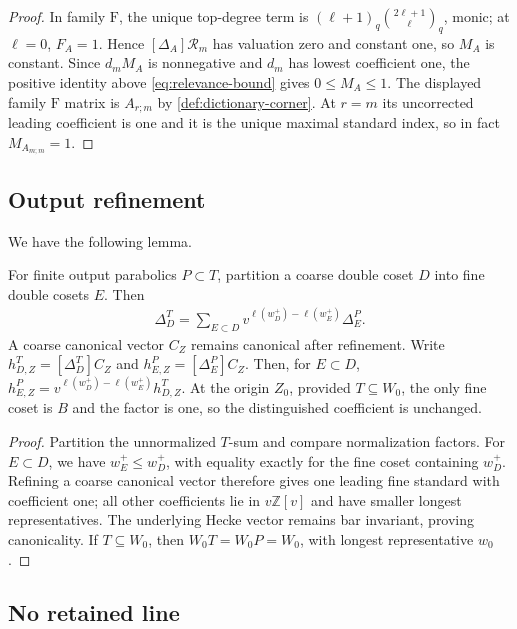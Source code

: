 \documentclass[a4paper,11pt]{amsart}
\numberwithin{equation}{subsection}
\theoremstyle{plain}
\theoremstyle{definition}
\theoremstyle{remark}
\newcommand{\gbinom}[2]{\binom{#1}{#2}}
\begin{document}
\begin{proof}
In family $\mathrm F$, the unique top-degree term is
$(\ell+1)_q\gbinom{2\ell+1}{\ell}_q$, monic; at $\ell=0$, $F_A=1$.
Hence $[\Delta_A]\mathcal R_m$ has valuation zero and constant
one, so $M_A$ is constant. Since $d_mM_A$ is nonnegative and
$d_m$ has lowest coefficient one, the positive identity above
\autoref{eq:relevance-bound} gives $0\le M_A\le1$.
The displayed family $\mathrm F$ matrix is $A_{r;m}$ by
\autoref{def:dictionary-corner}.  At $r=m$ its uncorrected leading coefficient is one and
it is the unique maximal standard index, so in fact $M_{A_{m;m}}=1$.
\end{proof}

\subsection{Output refinement}

We have the following lemma.

\begin{lemma}\label{lem:output-refinement}
For finite output parabolics $P\subset T$, partition a coarse double coset
$D$ into fine double cosets $E$. Then
\begin{gather}\label{eq:parabolic-refinement}
\Delta_D^T=\sum_{E\subset D}
v^{\ell(w_D^+)-\ell(w_E^+)}\Delta_E^P.
\end{gather}
A coarse canonical vector $C_Z$ remains canonical after refinement.
Write $h^T_{D,Z}=[\Delta_D^T]C_Z$ and $h^P_{E,Z}=[\Delta_E^P]C_Z$.
Then, for $E\subset D$,
$h^P_{E,Z}=v^{\ell(w_D^+)-\ell(w_E^+)}h^T_{D,Z}$.
At the origin $Z_0$, provided $T\subseteq W_0$, the only fine coset is $B$ and the factor is one,
so the distinguished coefficient is unchanged.
\end{lemma}

\begin{proof}
Partition the unnormalized $T$-sum and compare normalization
factors. For $E\subset D$, we have $w_E^+\le w_D^+$, with equality
exactly for the fine coset containing $w_D^+$.
Refining a coarse canonical vector therefore gives one leading fine
standard with coefficient one; all other coefficients lie in
$v\mathbb Z[v]$ and have smaller longest representatives.
The underlying Hecke vector remains bar invariant, proving canonicality.
If $T\subseteq W_0$, then $W_0T=W_0P=W_0$,
with longest representative $w_0$.
\end{proof}

\subsection{No retained line}\label{sec:full-spherical-gallery}
\end{document}
